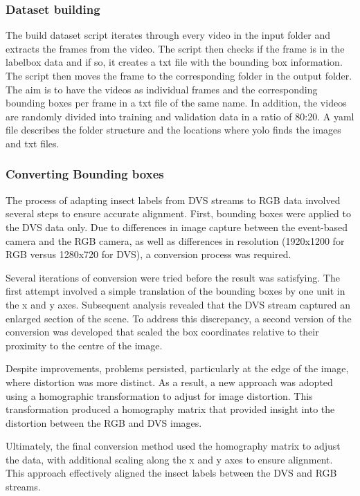 \subsubsection{Dataset building}

The build dataset script iterates through every video in the input folder and extracts the frames from the video. The script then checks if the frame is in the labelbox data and if so, it creates a txt file with the bounding box information. The script then moves the frame to the corresponding folder in the output folder. The aim is to have the videos as individual frames and the corresponding bounding boxes per frame in a txt file of the same name. In addition, the videos are randomly divided into training and validation data in a ratio of 80:20. A yaml file describes the folder structure and the locations where yolo finds the images and txt files. 

\subsubsection{Converting Bounding boxes}

The process of adapting insect labels from DVS streams to RGB data involved several steps to ensure accurate alignment. First, bounding boxes were applied to the DVS data only. Due to differences in image capture between the event-based camera and the RGB camera, as well as differences in resolution (1920x1200 for RGB versus 1280x720 for DVS), a conversion process was required.

Several iterations of conversion were tried before the result was satisfying. The first attempt involved a simple translation of the bounding boxes by one unit in the x and y axes. Subsequent analysis revealed that the DVS stream captured an enlarged section of the scene. To address this discrepancy, a second version of the conversion was developed that scaled the box coordinates relative to their proximity to the centre of the image.

Despite improvements, problems persisted, particularly at the edge of the image, where distortion was more distinct. As a result, a new approach was adopted using a homographic transformation to adjust for image distortion. This transformation produced a homography matrix that provided insight into the distortion between the RGB and DVS images.

Ultimately, the final conversion method used the homography matrix to adjust the data, with additional scaling along the x and y axes to ensure alignment. This approach effectively aligned the insect labels between the DVS and RGB streams.

